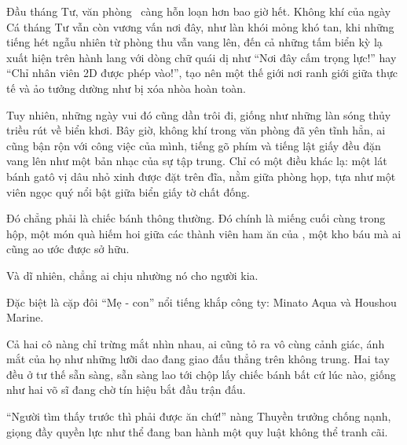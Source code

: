 \documentclass[../main.tex]{subfiles}
\begin{document}


Đầu tháng Tư, văn phòng \hll\ càng hỗn loạn hơn bao giờ hết. Không khí của ngày Cá tháng Tư vẫn còn vương vấn nơi đây, như làn khói mỏng khó tan, khi những tiếng hét ngẫu nhiên từ phòng thu vẫn vang lên, đến cả những tấm biển kỳ lạ xuất hiện trên hành lang với dòng chữ quái dị như ``Nơi đây cấm trọng lực!'' hay ``Chỉ nhân viên 2D được phép vào!'', tạo nên một thế giới nơi ranh giới giữa thực tế và ảo tưởng dường như bị xóa nhòa hoàn toàn.

Tuy nhiên, những ngày vui đó cũng dần trôi đi, giống như những làn sóng thủy triều rút về biển khơi. Bây giờ, không khí trong văn phòng đã yên tĩnh hẳn, ai cũng bận rộn với công việc của mình, tiếng gõ phím và tiếng lật giấy đều đặn vang lên như một bản nhạc của sự tập trung. Chỉ có một điều khác lạ: một lát bánh gatô vị dâu nhỏ xinh được đặt trên đĩa, nằm giữa phòng họp, tựa như một viên ngọc quý nổi bật giữa biển giấy tờ chất đống.

Đó chẳng phải là chiếc bánh thông thường. Đó chính là miếng cuối cùng trong hộp, một món quà hiếm hoi giữa các thành viên ham ăn của \hll, một kho báu mà ai cũng ao ước được sở hữu.

Và dĩ nhiên, chẳng ai chịu nhường nó cho người kia.

Đặc biệt là cặp đôi ``Mẹ - con'' nổi tiếng khắp công ty: Minato Aqua và Houshou Marine.

Cả hai cô nàng chỉ trừng mắt nhìn nhau, ai cũng tỏ ra vô cùng cảnh giác, ánh mắt của họ như những lưỡi dao đang giao đấu thẳng trên không trung. Hai tay đều ở tư thế sẵn sàng, sẵn sàng lao tới chộp lấy chiếc bánh bất cứ lúc nào, giống như hai võ sĩ đang chờ tín hiệu bắt đầu trận đấu.

``Người tìm thấy trước thì phải được ăn chứ!'' nàng Thuyền trưởng chống nạnh, giọng đầy quyền lực như thể đang ban hành một quy luật không thể tranh cãi.
\end{document}

